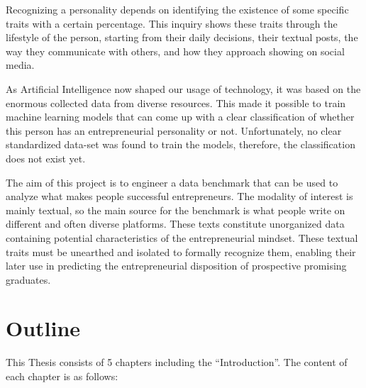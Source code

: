 Recognizing a personality depends on identifying the existence of some specific traits with a certain percentage. This inquiry shows these traits through the lifestyle of the person, starting from their daily decisions, their textual posts, the way they communicate with others, and how they approach showing on social media.

As Artificial Intelligence now shaped our usage of technology, it was based on the enormous collected data from diverse resources. This made it possible to train machine learning models that can come up with a clear classification of whether this person has an entrepreneurial personality or not. Unfortunately, no clear standardized data-set was found to train the models, therefore, the classification does not exist yet.

The aim of this project is to engineer a data benchmark that can be used to analyze what makes people successful entrepreneurs. The modality of interest is mainly textual, so the main source for the benchmark is what people write on different and often diverse platforms. These texts constitute unorganized data containing potential characteristics of the entrepreneurial mindset. These textual traits must be unearthed and isolated to formally recognize them, enabling their later use in predicting the entrepreneurial disposition of prospective promising graduates.

\section{Outline}
This Thesis consists of 5 chapters including the “Introduction”. The content of each chapter is as follows:

